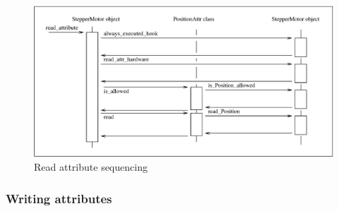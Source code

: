 \begin{figure}[H]
\begin{centering}
\includegraphics[scale=0.7]{ds_writing/r_attribute}
\par\end{centering}

\protect\caption{Read attribute sequencing\label{r_attribute_timing_fig}}
\end{figure}



\subsubsection{Writing attributes}


